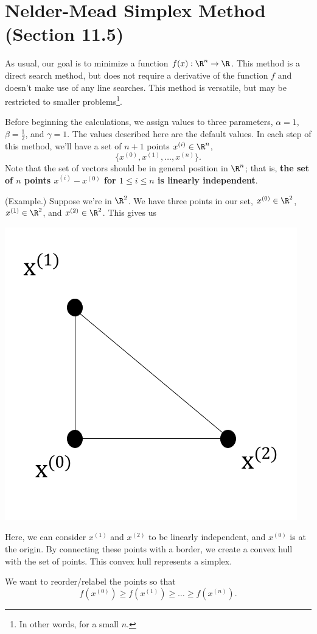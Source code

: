 \documentclass[letterpaper]{article}
\begin{document}
\section{Nelder-Mead Simplex Method (Section 11.5)}
As usual, our goal is to minimize a function $f(x): \R^n \to \R$. This method is a direct search method, but does not require a derivative of the function $f$ and doesn't make use of any line searches. This method is versatile, but may be restricted to smaller problems\footnote{In other words, for a small $n$.}. 

\bigskip 

Before beginning the calculations, we assign values to three parameters, $\alpha = 1$, $\beta = \frac{1}{2}$, and $\gamma = 1$. The values described here are the default values. In each step of this method, we'll have a set of $n + 1$ points $x^{(i)} \in \R^n$,  
\[\{x^{(0)}, x^{(1)}, \hdots, x^{(n)}\}.\]
Note that the set of vectors should be in general position in $\R^n$; that is, \textbf{the set of $n$ points $x^{(i)} - x^{(0)}$ for $1 \leq i \leq n$ is linearly independent}.

\begin{mdframed}
    (Example.) Suppose we're in $\R^2$. We have three points in our set, $x^{(0)} \in \R^2$, $x^{(1)} \in \R^2$, and $x^{(2)} \in \R^2$. This gives us 
    \begin{center}
        \includegraphics[scale=0.4]{../assets/triangle_simplex.png}
    \end{center}
    Here, we can consider $x^{(1)}$ and $x^{(2)}$ to be linearly independent, and $x^{(0)}$ is at the origin. By connecting these points with a border, we create a convex hull with the set of points. This convex hull represents a simplex. 
\end{mdframed}
We want to reorder/relabel the points so that 
\[f(x^{(0)}) \geq f(x^{(1)}) \geq \hdots \geq f(x^{(n)}).\]
\end{document}
